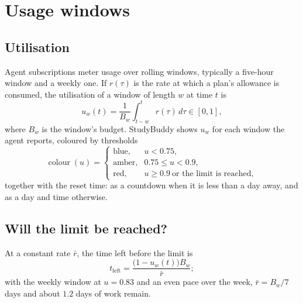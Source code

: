 \section{Usage windows}
\label{sec:usage}

\subsection{Utilisation}

Agent subscriptions meter usage over rolling windows, typically a five-hour
window and a weekly one. If $r(\tau)$ is the rate at which a plan's allowance
is consumed, the utilisation of a window of length $w$ at time $t$ is
\begin{equation}
  u_w(t) = \frac{1}{B_w} \int_{t-w}^{t} r(\tau)\, d\tau \in [0, 1],
  \label{eq:utilisation}
\end{equation}
where $B_w$ is the window's budget. StudyBuddy shows $u_w$ for each window the
agent reports, coloured by thresholds
\begin{equation}
  \operatorname{colour}(u) =
  \begin{cases}
    \text{blue}, & u < 0.75,\\
    \text{amber}, & 0.75 \le u < 0.9,\\
    \text{red}, & u \ge 0.9 \ \text{or the limit is reached},
  \end{cases}
\end{equation}
together with the reset time: as a countdown when it is less than a day away,
and as a day and time otherwise.

\subsection{Will the limit be reached?}

At a constant rate $\bar r$, the time left before the limit is
\begin{equation}
  t_{\text{left}} = \frac{\bigl(1 - u_w(t)\bigr) B_w}{\bar r} ;
\end{equation}
with the weekly window at $u = 0.83$ and an even pace over the week,
$\bar r = B_w / 7$\,days and about $1.2$ days of work remain.

